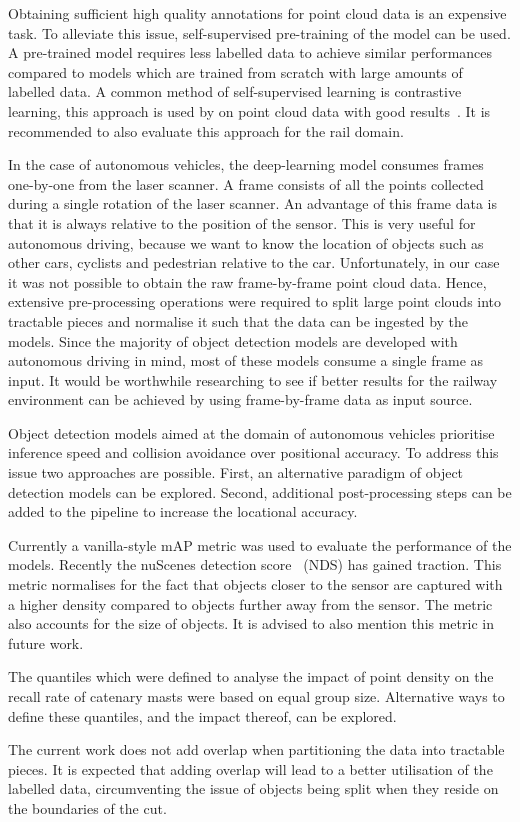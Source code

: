 Obtaining sufficient high quality annotations for point cloud data is an expensive task. To alleviate this issue, self-supervised pre-training of the model can be used. A pre-trained model requires less labelled data to achieve similar performances compared to models which are trained from scratch with large amounts of labelled data. A common method of self-supervised learning is contrastive learning, this approach is used by \citeauthor{depthcontrast21} on point cloud data with good results~\cite{depthcontrast21}. It is recommended to also evaluate this approach for the rail domain.

In the case of autonomous vehicles, the deep-learning model consumes frames one-by-one from the laser scanner. A frame consists of all the points collected during a single rotation of the laser scanner. An advantage of this frame data is that it is always relative to the position of the sensor. This is very useful for autonomous driving, because we want to know the location of objects such as other cars, cyclists and pedestrian relative to the car. Unfortunately, in our case it was not possible to obtain the raw frame-by-frame point cloud data. Hence, extensive pre-processing operations were required to split large point clouds into tractable pieces and normalise it such that the data can be ingested by the models. Since the majority of object detection models are developed with autonomous driving in mind, most of these models consume a single frame as input. It would be worthwhile researching to see if better results for the railway environment can be achieved by using frame-by-frame data as input source.

Object detection models aimed at the domain of autonomous vehicles prioritise inference speed and collision avoidance over positional accuracy. To address this issue two approaches are possible. First, an alternative paradigm of object detection models can be explored. Second, additional post-processing steps can be added to the pipeline to increase the locational accuracy. 

Currently a vanilla-style mAP metric was used to evaluate the performance of the models. Recently the nuScenes detection score~\cite{nuscenes20} (NDS) has gained traction. This metric normalises for the fact that objects closer to the sensor are captured with a higher density compared to objects further away from the sensor. The metric also accounts for the size of objects. It is advised to also mention this metric in future work.

The quantiles which were defined to analyse the impact of point density on the recall rate of catenary masts were based on equal group size. Alternative ways to define these quantiles, and the impact thereof, can be explored.

The current work does not add overlap when partitioning the data into tractable pieces. It is expected that adding overlap will lead to a better utilisation of the labelled data, circumventing the issue of objects being split when they reside on the boundaries of the cut.